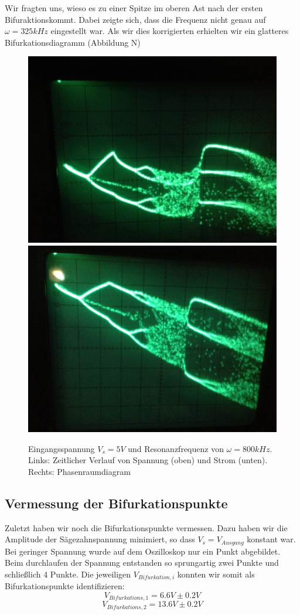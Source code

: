 \documentclass{scrartcl}
\begin{document}
Wir fragten uns, wieso es zu einer Spitze im oberen Ast nach der ersten Bifuraktionskommt. Dabei zeigte sich, dass die Frequenz nicht genau auf  $\omega=325kHz$ eingestellt war. Als wir dies korrigierten erhielten wir ein glatteres Bifurkationsdiagramm (Abbildung N)

\begin{figure}[!htbp]
\centering
\includegraphics[scale=0.18]{bif-ldr/bifurc-bad}
\includegraphics[scale=0.18]{bif-ldr/bifurc-good}
\caption{Eingangsspannung $V_s=5V$ und Resonanzfrequenz von $\omega=800kHz$. Links: Zeitlicher Verlauf von Spannung (oben) und Strom (unten). Rechts: Phasenraumdiagram}
\label{fig:ldr-bifurc}
\end{figure}
\subsection { Vermessung der Bifurkationspunkte }
Zuletzt haben wir noch die Bifurkationspunkte vermessen. Dazu haben wir die Amplitude der Sägezahnspannung minimiert, so dass $V_s=V_{Ausgang}$ konstant war. Bei geringer Spannung wurde auf dem Oszilloskop nur ein Punkt abgebildet. Beim durchlaufen der Spannung entstanden so sprungartig zwei Punkte und schließlich 4 Punkte. Die jeweiligen $V_{Bifurkation, i}$ konnten wir somit als Bifurkationspunkte identifizieren: 
$$V_{Bifurkations, 1}=6.6V \pm 0.2V$$
$$V_{Bifurkations, 2}=13.6V \pm 0.2V$$
\end{document}
